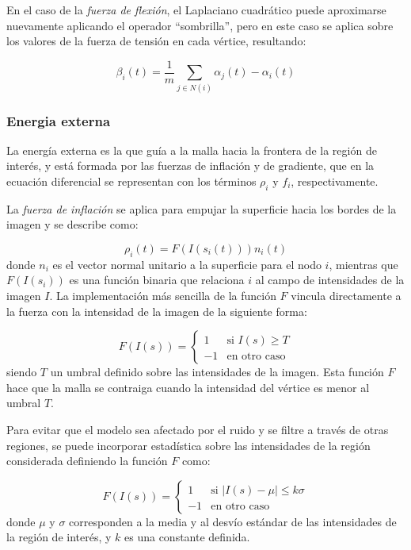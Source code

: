 En el caso de la \emph{fuerza de flexión}, el Laplaciano cuadrático puede aproximarse nuevamente aplicando el operador “sombrilla”, pero en este caso se aplica sobre los valores de la fuerza de tensión en cada vértice, resultando:

%
\begin{equation}
\beta_{i}(t) = \dfrac{1}{m} \sum_{j\in N(i)} \alpha_{j}(t) - \alpha_{i}(t)
\end{equation}
%
\subsubsection{Energia externa}\label{section:energia_externa}
La energía externa es la que guía a la malla hacia la frontera de la región de interés, y está formada por las fuerzas de inflación y de gradiente, que en la ecuación diferencial se representan con los términos $\rho_{i}$ y $f_{i}$, respectivamente.

La \emph{fuerza de inflación} se aplica para empujar la superficie hacia los bordes de la imagen y se describe como: 

%
\begin{equation}
\rho_{i}(t) = F(I(s_{i}(t))) n_{i}(t)
\end{equation}
%
donde $n_{i}$ es el vector normal unitario a la superficie para el nodo $i$, mientras que $F(I(s_{i}))$ es una función binaria que relaciona $i$ al campo de intensidades de la imagen $I$. La implementación más sencilla de la función $F$ vincula directamente a la fuerza con la intensidad de la imagen de la siguiente forma:

%
\begin{equation}
F(I(s)) = \begin{cases} 1 & \text{si } I(s) \geq T \\ -1 & \text{en otro caso} \end{cases}
\end{equation}
%
siendo $T$ un umbral definido sobre las intensidades de la imagen. Esta función $F$ hace que la malla se contraiga cuando la intensidad del vértice es menor al umbral $T$.

Para evitar que el modelo sea afectado por el ruido y se filtre a través de otras regiones, se puede incorporar estadística sobre las intensidades de la región considerada \citep{ivins1994statistical} definiendo la función $F$ como:

%
\begin{equation}
F(I(s)) = \begin{cases} 1 & \text{si } \left|I(s) - \mu \right| \leq k\sigma \\ -1 & \text{en otro caso} \end{cases}
\end{equation}
%
donde $\mu$ y $\sigma$ corresponden a la media y al desvío estándar de las intensidades de la región de interés, y $k$ es una constante definida.

